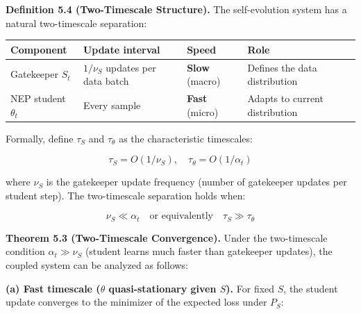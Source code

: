 \documentclass[
  12pt,
]{article}
\begin{document}
\textbf{Definition 5.4 (Two-Timescale Structure).} The self-evolution
system has a natural two-timescale separation:

\begin{longtable}[]{@{}
  >{\raggedright\arraybackslash}p{}
  >{\raggedright\arraybackslash}p{}
  >{\raggedright\arraybackslash}p{}
  >{\raggedright\arraybackslash}p{}@{}}
\toprule\noalign{}
\begin{minipage}[b]{\linewidth}\raggedright
Component
\end{minipage} & \begin{minipage}[b]{\linewidth}\raggedright
Update interval
\end{minipage} & \begin{minipage}[b]{\linewidth}\raggedright
Speed
\end{minipage} & \begin{minipage}[b]{\linewidth}\raggedright
Role
\end{minipage} \\
\midrule\noalign{}
\endhead
\bottomrule\noalign{}
\endlastfoot
Gatekeeper \(S_t\) & \(1 / \nu_S\) updates per data batch &
\textbf{Slow} (macro) & Defines the data distribution \\
NEP student \(\theta_t\) & Every sample & \textbf{Fast} (micro) & Adapts
to current distribution \\
\end{longtable}

Formally, define \(\tau_S\) and \(\tau_\theta\) as the characteristic
timescales:

\[
\tau_S = O(1/\nu_S), \quad \tau_\theta = O(1/\alpha_t)
\]

where \(\nu_S\) is the gatekeeper update frequency (number of gatekeeper
updates per student step). The two-timescale separation holds when:

\[
\nu_S \ll \alpha_t \quad \text{or equivalently} \quad \tau_S \gg \tau_\theta
\]

\textbf{Theorem 5.3 (Two-Timescale Convergence).} Under the
two-timescale condition \(\alpha_t \gg \nu_S\) (student learns much
faster than gatekeeper updates), the coupled system can be analyzed as
follows:

\textbf{(a) Fast timescale (\(\theta\) quasi-stationary given \(S\)).}
For fixed \(S\), the student update converges to the minimizer of the
expected loss under \(P_S\):
\end{document}
